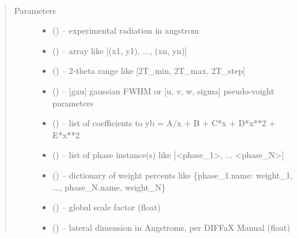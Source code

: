 \documentclass[letterpaper,10pt,english]{sphinxmanual}
\begin{document}
\begin{fulllineitems}
\begin{fulllineitems}
\label{\detokenize{rst/refinement:mstack.refinement.Refinement.__init__}}~\begin{quote}\begin{description}
\item[{Parameters}] \leavevmode\begin{itemize}
\item {} 
 (\sphinxstyleliteralemphasis{*}) -- experimental radiation in angstrom

\item {} 
 (\sphinxstyleliteralemphasis{*}) -- array like {[}(x1, y1), ..., (xn, yn){]}

\item {} 
 (\sphinxstyleliteralemphasis{*}) -- 2-theta range like {[}2T\_min, 2T\_max, 2T\_step{]}

\item {} 
 (\sphinxstyleliteralemphasis{*}) -- {[}gau{]} gaussian FWHM or {[}u, v, w, sigma{]} pseudo-voight parameters

\item {} 
 (\sphinxstyleliteralemphasis{*}) -- list of coefficients to yb = A/x + B + C*x + D*x**2 + E*x**2

\item {} 
 (\sphinxstyleliteralemphasis{*}) -- list of phase instance(s) like {[}\textless{}phase\_1\textgreater{}, ... \textless{}phase\_N\textgreater{}{]}

\item {} 
 (\sphinxstyleliteralemphasis{*}) -- dictionary of weight percents like \{phase\_1.name: weight\_1, ..., phase\_N.name, weight\_N\}

\item {} 
 (\sphinxstyleliteralemphasis{*}) -- global scale factor (float)

\item {} 
 (\sphinxstyleliteralemphasis{*}) -- lateral dimension in Angstroms, per DIFFaX Manual (float)


\end{itemize}
\end{description}
\end{quote}
\end{fulllineitems}
\end{fulllineitems}
\end{document}

